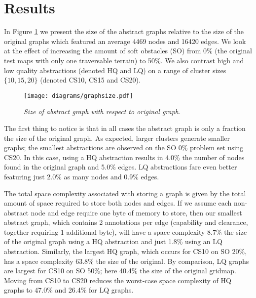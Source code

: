 \section{Results}
In Figure \ref{aha-fig:graphsize} we present the size of the abstract graphs relative to the size of the original graphs which featured an average 4469 nodes and 16420 edges. 
We look at the effect of increasing the amount of soft obstacles (SO) from 0\% (the original test maps with only one traversable terrain) to 50\%.
We also contrast high and low quality abstractions (denoted HQ and LQ) on a range of cluster sizes $\lbrace 10, 15, 20 \rbrace$ (denoted CS10, CS15 and CS20).
\begin{figure}[htbp]
	\vspace{-12pt}
       \caption{\small{\emph{Size of abstract graph with respect to original graph. }}}
       \begin{center}
                       \texttt{[image: diagrams/graphsize.pdf]}
       \end{center}
       \label{aha-fig:graphsize}
	\vspace{-4pt}
\end{figure}
\par \indent
The first thing to notice is that in all cases the abstract graph is only a fraction the size of the original graph.
As expected, larger clusters generate smaller graphs; the smallest abstractions are observed on the SO 0\% problem set using CS20. 
In this case, using a HQ abstraction results in 4.0\% the number of nodes found in the original graph and 5.0\% edges. 
LQ abstractions fare even better featuring just 2.0\% as many nodes and 0.9\% edges.
\par \indent
The total space complexity associated with storing a graph is given by the total amount of space required to store both nodes and edges.
If we assume each non-abstract node and edge require one byte of memory to store, then our smallest abstract graph, which contains 2 annotations per edge (capability and clearance, together requiring 1 additional byte), will have a space complexity 8.7\% the size of the original graph using a HQ abstraction and just 1.8\% using an LQ abstraction.
Similarly, the largest HQ graph, which occurs for CS10 on SO 20\%, has a space complexity 63.8\% the size of the original.
By comparison, LQ graphs are largest for CS10 on SO 50\%; here 40.4\% the size of the original gridmap.
Moving from CS10 to CS20 reduces the worst-case space complexity of HQ graphs to 47.0\% and 26.4\% for LQ graphs.
